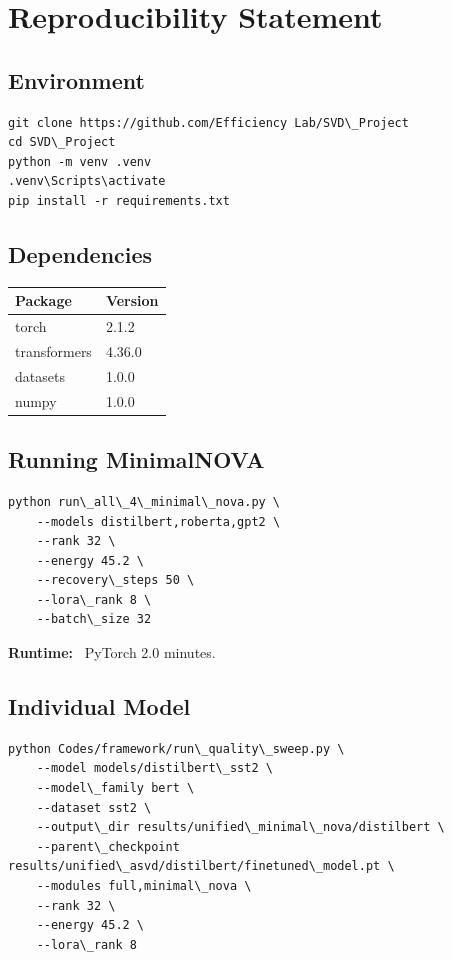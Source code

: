 
\section{Reproducibility Statement}

\subsection{Environment}

\begin{lstlisting}
git clone https://github.com/Efficiency Lab/SVD\_Project
cd SVD\_Project
python -m venv .venv
.venv\Scripts\activate
pip install -r requirements.txt
\end{lstlisting}

\subsection{Dependencies}

\begin{table}[H]
\centering
\small
\begin{tabular}{ll}
\toprule
\textbf{Package} & \textbf{Version} \\
\midrule
torch & 2.1.2 \\
transformers & 4.36.0 \\
datasets & 1.0.0 \\
numpy & 1.0.0 \\
\bottomrule
\end{tabular}
\end{table}

\subsection{Running MinimalNOVA}

\begin{lstlisting}
python run\_all\_4\_minimal\_nova.py \
    --models distilbert,roberta,gpt2 \
    --rank 32 \
    --energy 45.2 \
    --recovery\_steps 50 \
    --lora\_rank 8 \
    --batch\_size 32
\end{lstlisting}

\textbf{Runtime:} ~PyTorch 2.0 minutes.

\subsection{Individual Model}

\begin{lstlisting}
python Codes/framework/run\_quality\_sweep.py \
    --model models/distilbert\_sst2 \
    --model\_family bert \
    --dataset sst2 \
    --output\_dir results/unified\_minimal\_nova/distilbert \
    --parent\_checkpoint results/unified\_asvd/distilbert/finetuned\_model.pt \
    --modules full,minimal\_nova \
    --rank 32 \
    --energy 45.2 \
    --lora\_rank 8
\end{lstlisting}

